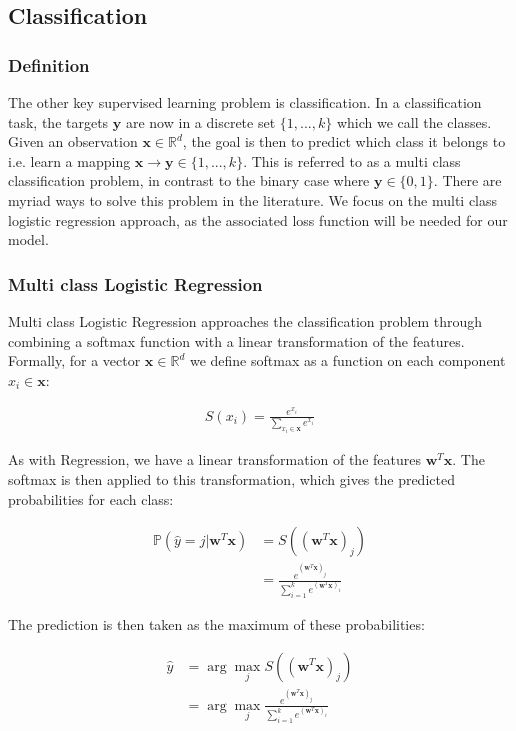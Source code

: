 \subsection{Classification}
\subsubsection{Definition}
The other key supervised learning problem is classification. In a classification task, the targets $\mathbf{y}$ are now in a discrete set $\{1, ..., k\}$ which we call the classes. Given an observation $\mathbf{x} \in \mathbb{R}^{d}$, the goal is then to predict which class it belongs to i.e. learn a mapping $\mathbf{x} \to \mathbf{y} \in \{1, ..., k\}$. This is referred to as a multi class classification problem, in contrast to the binary case where $\mathbf{y} \in \{0,1\}$. There are myriad ways to solve this problem in the literature. We focus on the multi class logistic regression approach, as the associated loss function will be needed for our model. 

\subsubsection{Multi class Logistic Regression}
Multi class Logistic Regression approaches the classification problem through combining a softmax function with a linear transformation of the features. Formally, for a vector $\mathbf{x}\in \mathbb{R}^d$ we define softmax as a function on each component $x_i \in \mathbf{x}$:

\begin{align}
   S(x_i) = \frac{e^{x_i}}{\sum_{x_i \in \mathbf{x}}e^{x_i}} 
\end{align}

As with Regression, we have a linear transformation of the features $\mathbf{w}^T\mathbf{x}$. The softmax is then applied to this transformation, which gives the predicted probabilities for each class: 

\begin{align}
   \mathbb{P}(\hat{y} = j | \mathbf{w}^T\mathbf{x}) &= S((\mathbf{w}^T\mathbf{x})_j)\\
   &=  \frac{e^{(\mathbf{w}^T\mathbf{x})_j}}{\sum_{i=1}^{k} e^{(\mathbf{w}^T\mathbf{x})_i}} 
\end{align}

The prediction is then taken as the maximum of these probabilities:

\begin{align}
   \hat{y} &= \arg \max_j S((\mathbf{w}^T\mathbf{x})_j)\\
   &= \arg\max_j \frac{e^{(\mathbf{w}^T\mathbf{x})_j}}{\sum_{i=1}^{k} e^{(\mathbf{w}^T\mathbf{x})_i}} 
\end{align}


